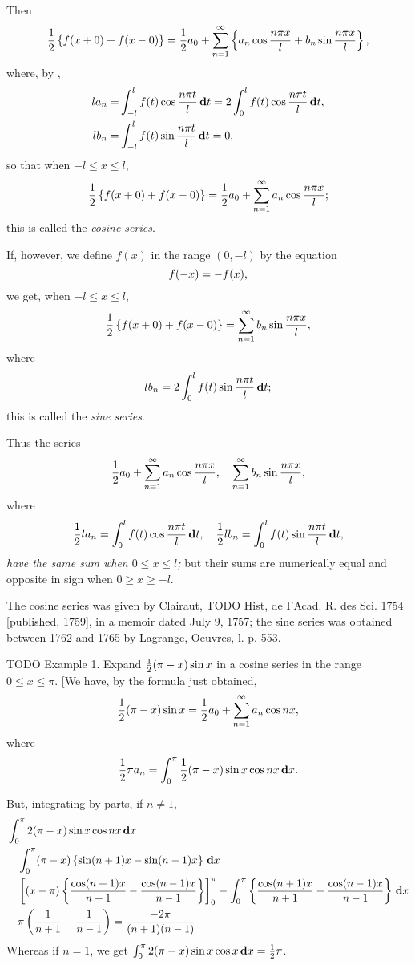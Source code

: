Then
$$
\frac{1}{2} \left\{  f(x+0) + f(x-0)  \right\}
=
\frac{1}{2} a_{0}
+
\sum_{n=1}^{\infty} \left\{ 
  a_{n} \cos \frac{n \pi x}{l}
  +
  b_{n} \sin \frac{n \pi x}{l}
 \right\},
$$
where, by ,
\begin{align*}
  l a_{n}
  =&
  \int_{-l}^{l} f(t) \cos \frac{n \pi t}{l} \, \mathbf{d} t
  =
  2 \int_{0}^{l} f(t) \cos \frac{n \pi t}{l} \, \mathbf{d} t,
  \\
  l b_{n}
  =&
  \int_{-l}^{l} f(t) \sin \frac{n \pi t}{l} \, \mathbf{d} t
  = 0,
\end{align*}
so that when $-l \leq x \leq l$,
$$
\frac{1}{2} \left\{  f(x+0) + f(x-0)  \right\}
=
\frac{1}{2} a_{0} + \sum_{n=1}^{\infty} a_{n} \cos \frac{n \pi x}{l};
$$
this is called the \emph{cosine series}.

If, however, we define $f(x)$ in the range $(0,-l)$ by the equation
$$
f(-x) = -f(\wandwtypo{-}{}x),\index{Odd functions}
$$
%
%
we get, when $-l \leq x \leq l$,
$$
\frac{1}{2} \left\{  f(x+0) + f(x-0)  \right\}
=
\sum_{n=1}^{\infty} b_{n} \sin \frac{n \pi x}{l},
$$
where
$$
l b_{n}
=
2 \int_{0}^{l} f(t) \sin \frac{n \pi t}{l} \, \mathbf{d} t;
$$
this is called the \emph{sine series}.

Thus the series
$$
\frac{1}{2} a_{0}
+
\sum_{n=1}^{\infty} a_{n} \cos \frac{n \pi x}{l},
\quad
\sum_{n=1}^{\infty} b_{n} \sin \frac{n \pi x}{l},
$$
where
$$
\frac{1}{2} l a_{n}
=
\int_{0}^{l} f(t) \cos \frac{n \pi t}{l} \, \mathbf{d} t,
\quad
\frac{1}{2} l b_{n}
=
\int_{0}^{l} f(t) \sin \frac{n \pi t}{l} \, \mathbf{d} t,
$$
\emph{have the same sum when $0 \leq x \leq l$;}
but their sums are numerically
equal and opposite in sign when $0 \geq x \geq -l$.

The cosine series was given by Clairaut, TODO Hist, de I'Acad. R. des Sci.
1754 [published, 1759], in a memoir dated July 9, 1757; the sine
series was obtained between 1762 and 1765 by Lagrange, Oeuvres, l. p.
553.

TODO Example 1. Expand $\frac{1}{2} (\pi - x) \sin x$ in a cosine series in the range
$0 \leq x \leq \pi$.
[We have, by the formula just obtained,
$$
\frac{1}{2} (\pi - x) \sin x
=
\frac{1}{2} a_{0}
+ \sum_{n=1}^{\infty} a_{n} \cos nx,
$$
where
$$
\frac{1}{2} \pi a_{n}
=
\int_{0}^{\pi} \frac{1}{2} (\pi - x) \sin x \cos nx \, \mathbf{d} x.
$$

But, integrating by parts, if $n \neq 1$,
\begin{align*}
  &
  \int_{0}^{\pi} 2 (\pi - x) \sin x \cos nx \, \mathbf{d} x
  \\
  & \quad
  \int_{0}^{\pi} (\pi - x) \left\{ 
    \sin (n+1) x - \sin (n-1) x
   \right\} \, \mathbf{d} x
  \\
  & \quad
  \left[ 
    (x - \pi)
    \left\{ 
      \frac{ \cos (n+1) x }{n+1}
      -
      \frac{ \cos (n-1) x }{n-1}
     \right\}
   \right]_{0}^{\pi}
  -
  \int_{0}^{\pi}
  \left\{ 
    \frac{ \cos (n+1) x }{n+1}
    -
    \frac{ \cos (n-1) x }{n-1}
   \right\}
  \, \mathbf{d} x
  \\
  & \quad
  \pi
  \left( 
    \frac{1}{n+1}
    -
    \frac{1}{n-1}
   \right)
  =
  \frac{-2\pi}{(n+1)(n-1)}
\end{align*}
Whereas if $n=1$, we get
$\int_{0}^{\pi} 2 (\pi - x) \sin x \cos x \, \mathbf{d} x = \frac{1}{2} \pi$.

